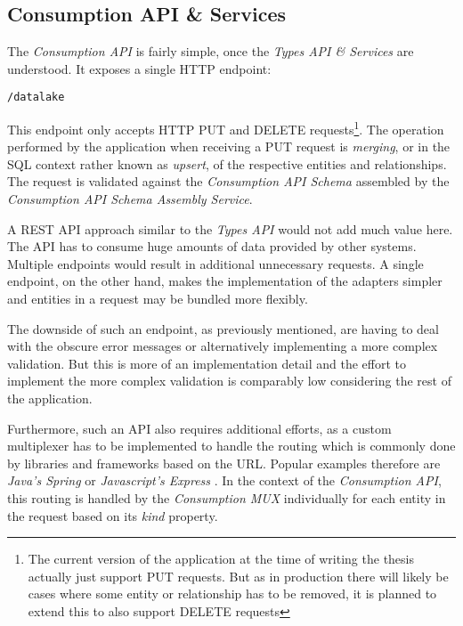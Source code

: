 \subsection{Consumption API \& Services}
The \emph{Consumption API} is fairly simple, once the \emph{Types API \& Services} are understood. It exposes a single HTTP endpoint:

\begin{lstlisting}[caption=Consumption API Endpoint, captionpos=b, label=lst:ConsumptionEndpoint]
/datalake
\end{lstlisting}

This endpoint only accepts HTTP PUT and DELETE requests\footnote{The current version of the application at the time of writing the thesis actually just support PUT requests. But as in production there will likely be cases where some entity or relationship has to be removed, it is planned to extend this to also support DELETE requests}. The operation performed by the application when receiving a PUT request is \emph{merging}, or in the SQL context rather known as \emph{upsert}, of the respective entities and relationships. The request is validated against the \emph{Consumption API Schema} assembled by the \emph{Consumption API Schema Assembly Service}.\par 
A REST API approach similar to the \emph{Types API} would not add much value here. The API has to consume huge amounts of data provided by other systems. Multiple endpoints would result in additional unnecessary requests. A single endpoint, on the other hand, makes the implementation of the adapters simpler and entities in a request may be bundled more flexibly.\par
The downside of such an endpoint, as previously mentioned, are having to deal with the obscure error messages or alternatively implementing a more complex validation. But this is more of an implementation detail and the effort to implement the more complex validation is comparably low considering the rest of the application.\par
Furthermore, such an API also requires additional efforts, as a custom multiplexer has to be implemented to handle the routing which is commonly done by libraries and frameworks based on the URL. Popular examples therefore are \emph{Java's Spring} \cite{Spring} or \emph{Javascript's Express} \cite{Express}. In the context of the \emph{Consumption API}, this routing is handled by the \emph{Consumption MUX} individually for each entity in the request based on its \emph{kind} property. 

